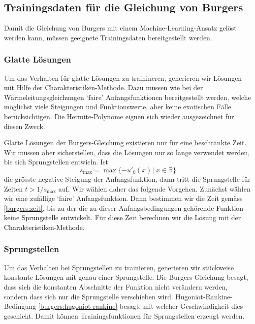 %
%
%
\subsection{Trainingsdaten für die Gleichung von Burgers\label{burgers:training}}
Damit die Gleichung von Burgers mit einem Machine-Learning-Ansatz gelöst
werden kann, müssen geeignete Trainingsdaten bereitgestellt werden.

\def\ck{\discretionary{k-}{k}{ck}}
\subsubsection{Glatte Lösungen}
Um das Verhalten für glatte Lösungen zu trainineren, generieren
wir Lösungen mit Hilfe der Cha\-rak\-te\-ris\-ti\-ken-Methode.
Dazu müssen wie bei der Wärmeleitungsgleichungen `faire' Anfangsfunktionen 
bereitgestellt werden, welche möglichst viele Steigungen und Funktionswerte,
aber keine exotischen Fälle berücksichtigen.
Die Hermite-Polynome eignen sich wieder ausgezeichnet für diesen Zweck.

Glatte Lösungen der Burgers-Gleichung existieren nur für eine beschränkte Zeit.
Wir müssen aber sicherstellen, dass die Lösungen nur so lange verwendet
werden, bis sich Sprungstellen entwi\ck{}eln.
Ist
\begin{equation}
s_{\text{max}} = \max \{ -u'_0(x)\,|\, x\in\mathbb R\}
\label{burgers:zeit}
\end{equation}
die grösste negative Steigung der Anfangsfunktion, dann tritt die Sprungstelle
für Zeiten $t> 1/s_{\text{max}}$ auf.
Wir wählen daher das folgende Vorgehen.
Zunächst wählen wir eine zufällige `faire' Anfangsfunktion.
Dann bestimmen wir die Zeit
gemäss \eqref{burgers:zeit}, bis zu der die zu dieser Anfangsbedingungen
gehörende Funktion keine Sprungstelle entwickelt.
Für diese Zeit berechnen wir die Lösung mit der Charakteristiken-Methode.

\subsubsection{Sprungstellen}
Um das Verhalten bei Sprungstellen zu trainieren, generieren wir
stückweise konstante Lösungen mit genau einer Sprungstelle.
Die Burgers-Gleichung besagt, dass sich die konstanten Abschnitte
der Funktion nicht verändern werden, sondern dass sich nur die Sprungstelle
verschieben wird.
Hugoniot-Rankine-Bedingung \eqref{burgers:hugoniot-rankine} besagt,
mit welcher Geschwindigkeit dies geschieht.
Damit können Trainingsfunktionen für Sprungstellen erzeugt werden.

